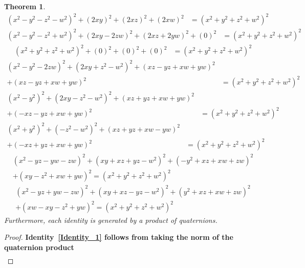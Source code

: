 \documentclass[12pt,table]{article}
\newtheorem{theorem}{Theorem}
\numberwithin{equation}{section}
\begin{document}
\begin{landscape}
{{\begin{theorem}
\begin{align}
\label{Identity_1}
    (x^2 - y^2 - z^2 - w^2 )^2 + (2xy)^2 + (2xz)^2 + (2xw)^2 
    &= (x^2 + y^2 + z^2 + w^2)^2 
\end{align}
\begin{align}
\label{Identity_2}
    (x^2 - y^2 - z^2 + w^2 )^2 + (2xy - 2zw)^2 + (2xz + 2yw)^2 + (0)^2 
    &= (x^2 + y^2 + z^2 + w^2)^2
\end{align}
\begin{align}
\label{Identity_3}
    (x^2 + y^2 + z^2 + w^2 )^2 + (0)^2 + (0)^2 + (0)^2 
    &= (x^2 + y^2 + z^2 + w^2)^2
\end{align}
\begin{align}
\label{Identity_4}
    (x^2 - y^2 - 2zw )^2 + (2xy + z^2 - w^2)^2 
    + (xz - yz + xw + yw)^2\nonumber
    \\
    + (xz - yz + xw + yw)^2 
        &= (x^2 + y^2 + z^2 + w^2)^2
\end{align}
\begin{align}
\label{Identity_5}
    (x^2 - y^2 )^2 + (2xy - z^2 - w^2)^2 
        + (xz + yz + xw + yw)^2 \nonumber
        \\
        + (-xz - yz + xw + yw)^2 
    &= (x^2 + y^2 + z^2 + w^2)^2
\end{align}
\begin{align}
\label{Identity_6}
    (x^2 + y^2 )^2 + (- z^2 - w^2)^2 
        + (xz + yz + xw - yw)^2  \nonumber
        \\
      + (-xz + yz + xw + yw)^2
    &= (x^2 + y^2 + z^2 + w^2)^2
\end{align}
\begin{align}
\label{Identity_7}
    (x^2 - yz - yw - zw )^2 + (xy + xz + yz - w^2)^2 
        + (-y^2 + xz + xw + zw)^2 \nonumber
        \\
        + (xy - z^2 + xw + yw)^2 
    = (x^2 + y^2 + z^2 + w^2)^2
\end{align}
\begin{align}
\label{Identity_8}
    (x^2 - yz + yw - zw )^2 + (xy + xz - yz - w^2)^2 
        + (y^2 + xz + xw + zw)^2 \nonumber
        \\
        + (xw - xy - z^2  + yw)^2 
            = (x^2 + y^2 + z^2 + w^2)^2
\end{align}
Furthermore, each identity
is generated by a product of quaternions. 
\end{theorem}
\begin{proof}
\bf
Identity~\eqref{Identity_1} follows from taking the norm of the quaternion product
    \begin{align*}

\end{align*}
\end{proof}}}
\end{landscape}
\end{document}
